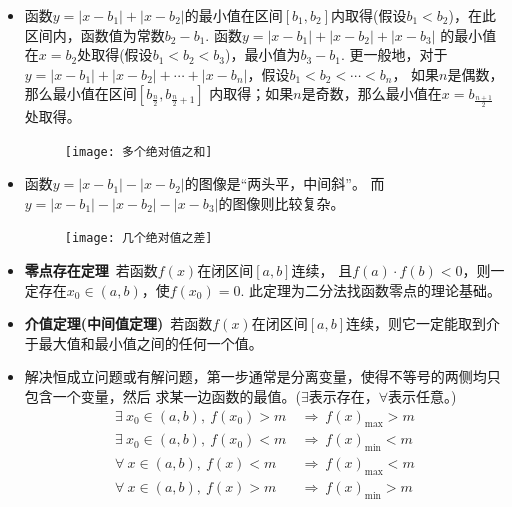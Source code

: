 \begin{itemize}[leftmargin=\inteval{\myitemleftmargin}pt,itemsep=
   \inteval{\myitemitempsep}pt,topsep=\inteval{\myitemtopsep}pt]
\item 函数$ y=|x-b_1|+|x-b_2| $的最小值在区间$ [b_1,b_2] $内取得(假设$ b_1<
b_2 $)，在此区间内，函数值为常数$ b_2-b_1 $. 函数$ y=|x-b_1|+|x-b_2|+|x-b_3| $
的最小值在$ x=b_2 $处取得(假设$ b_1<b_2<b_3 $)，最小值为$ b_3-b_1 $. 
更一般地，对于$ y=|x-b_1|+|x-b_2|+\cdots+|x-b_n| $，假设$ b_1<b_2<\cdots<b_n $，
如果$ n $是偶数，那么最小值在区间$ [b_{\frac{n}{2}},b_{\frac{n}{2}+1}] $
内取得；如果$ n $是奇数，那么最小值在$ x=b_{\frac{n+1}{2}} $处取得。

\begin{figure}[h]
    \centering
    \texttt{[image: 多个绝对值之和]}
\end{figure} 

\item 函数$ y=|x-b_1|-|x-b_2| $的图像是“两头平，中间斜”。
而$ y=|x-b_1|-|x-b_2|-|x-b_3| $的图像则比较复杂。
\begin{figure}[h]
    \centering
    \texttt{[image: 几个绝对值之差]}
\end{figure}

\item \textbf{零点存在定理}\ 若函数$ f(x) $在闭区间$ [a,b] $连续，
且$ f(a)\cdot f(b)<0 $，则一定存在$ x_0\in(a,b) $，使$ f(x_0)=0 $. 
此定理为二分法找函数零点的理论基础。

\item \textbf{介值定理(中间值定理)}\ 若函数$ f(x) $在闭区间$ [a,b] $连续，则它一定能取到介于最大值和最小值之间的任何一个值。

\item 解决恒成立问题或有解问题，第一步通常是分离变量，使得不等号的两侧均只包含一个变量，然后
求某一边函数的最值。($ \exists $表示存在，$ \forall $表示任意。)
\begin{align*}
    \exists\ x_0\in(a,b),\ f(x_0)>m &\ \Rightarrow \ f(x)_{\max} >m \\
    \exists\ x_0\in(a,b),\ f(x_0)<m &\ \Rightarrow \ f(x)_{\min} <m \\
    \forall\ x\in(a,b),\ f(x)<m &\ \Rightarrow \ f(x)_{\max} <m \\
    \forall\ x\in(a,b),\ f(x)>m &\ \Rightarrow \ f(x)_{\min} >m 
\end{align*}

\end{itemize}

